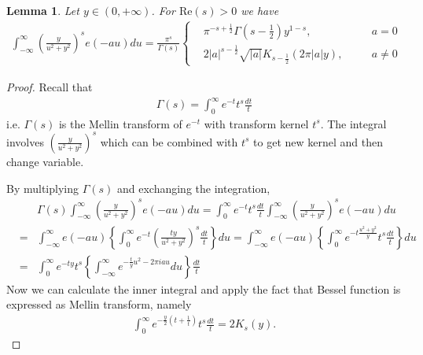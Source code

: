 \documentclass[11pt,reqno]{amsart}
\newcommand{\bna}{\begin{eqnarray*}}
\newcommand{\ena}{\end{eqnarray*}}
\def\re{{\mathrm{Re}}}
\newtheorem{lemma}{Lemma}[section]
\theoremstyle{definition}
\begin{document}
\begin{lemma}\label{lemma-integral-Whitaker-Bessel}Let $y\in(0,+\infty)$.
For $\re(s)>0$ we have
\bna
\int_{-\infty}^\infty \left(\frac{y}{u^2+y^2}\right)^se(-au)du
=\frac{\pi^s}{\Gamma(s)}\left\{
\begin{aligned}
&\pi^{-s+\frac{1}{2}}\Gamma(s-\frac{1}{2})y^{1-s},\quad &&a=0\\
&2|a|^{s-\frac{1}{2}}\sqrt{|a|}K_{s-\frac{1}{2}}(2\pi|a|y),\quad &&a\neq 0
\end{aligned}
\right.
\ena

\end{lemma}
\begin{proof}
Recall that
\bna
\Gamma(s)=\int_0^\infty e^{-t}t^s\frac{dt}{t}
\ena
i.e. $\Gamma(s)$ is the Mellin transform of $e^{-t}$ with transform kernel $t^s$.
The integral involves $\left(\frac{y}{u^2+y^2}\right)^s$ which can be combined with $t^s$
to get new kernel and then change variable.

By multiplying  $\Gamma(s)$ and exchanging the integration,
\bna
&&\Gamma(s)
\int_{-\infty}^\infty \left(\frac{y}{u^2+y^2}\right)^se(-au)du
=\int_{0}^\infty e^{-t}t^{s}\frac{dt}{t}\int_{-\infty}^\infty \left(\frac{y}{u^2+y^2}\right)^se(-au)du\\
&=&\int_{-\infty}^\infty  e(-au)
\left\{\int_{0}^\infty e^{-t}\left(\frac{ty}{u^2+y^2}\right)^s\frac{dt}{t}\right\}du
=\int_{-\infty}^\infty  e(-au)
\left\{\int_{0}^\infty e^{-t\frac{u^2+y^2}{y}}t^s\frac{dt}{t}\right\}du\\
&=&
\int_{0}^\infty e^{-ty}t^s
\left\{\int_{-\infty}^\infty e^{-\frac{t}{y}u^2-2\pi i au}du\right\}\frac{dt}{t}
\ena
Now we can calculate the inner integral and apply the fact that Bessel function is expressed
as Mellin transform, namely
\bna
\int_0^\infty e^{-\frac{y}{2}(t+\frac{1}{t})}t^s\frac{dt}{t}=2 K_s(y).
\ena

\end{proof}
\end{document}
